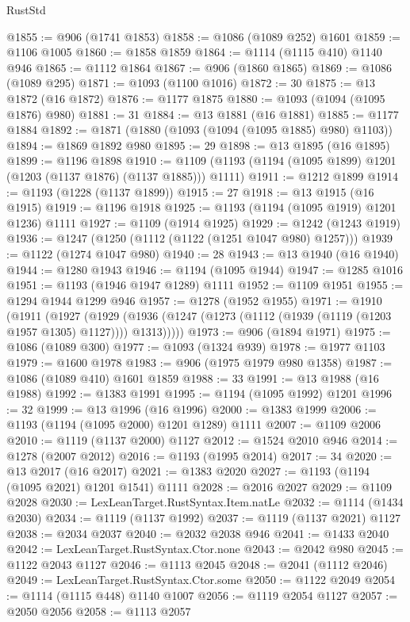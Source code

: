 \begin{lexlean}{RustStd}
\begin{coremodule}
{\begin{coremodule}
{{{{{{{{{{{{{{{{{{{{{{{{{{{{{{{@1855 := @906 (@1741 @1853)
@1858 := @1086 (@1089 @252) @1601
@1859 := @1106 @1005
@1860 := @1858 @1859
@1864 := @1114 (@1115 @410) @1140 @946
@1865 := @1112 @1864
@1867 := @906 (@1860 @1865)
@1869 := @1086 (@1089 @295)
@1871 := @1093 (@1100 @1016)
@1872 := 30
@1875 := @13 @1872 (@16 @1872)
@1876 := @1177 @1875
@1880 := @1093 (@1094 (@1095 @1876) @980)
@1881 := 31
@1884 := @13 @1881 (@16 @1881)
@1885 := @1177 @1884
@1892 := @1871 (@1880 (@1093 (@1094 (@1095 @1885) @980) @1103))
@1894 := @1869 @1892 @980
@1895 := 29
@1898 := @13 @1895 (@16 @1895)
@1899 := @1196 @1898
@1910 := @1109 (@1193 (@1194 (@1095 @1899) @1201 (@1203 (@1137 @1876) (@1137 @1885))) @1111)
@1911 := @1212 @1899
@1914 := @1193 (@1228 (@1137 @1899))
@1915 := 27
@1918 := @13 @1915 (@16 @1915)
@1919 := @1196 @1918
@1925 := @1193 (@1194 (@1095 @1919) @1201 @1236) @1111
@1927 := @1109 (@1914 @1925)
@1929 := @1242 (@1243 @1919)
@1936 := @1247 (@1250 (@1112 (@1122 (@1251 @1047 @980) @1257)))
@1939 := @1122 (@1274 @1047 @980)
@1940 := 28
@1943 := @13 @1940 (@16 @1940)
@1944 := @1280 @1943
@1946 := @1194 (@1095 @1944)
@1947 := @1285 @1016
@1951 := @1193 (@1946 @1947 @1289) @1111
@1952 := @1109 @1951
@1955 := @1294 @1944 @1299 @946
@1957 := @1278 (@1952 @1955)
@1971 := @1910
    (@1911
      (@1927
        (@1929 (@1936 (@1247 (@1273 (@1112 (@1939 (@1119 (@1203 @1957 @1305) @1127)))) @1313)))))
@1973 := @906 (@1894 @1971)
@1975 := @1086 (@1089 @300)
@1977 := @1093 (@1324 @939)
@1978 := @1977 @1103
@1979 := @1600 @1978
@1983 := @906 (@1975 @1979 @980 @1358)
@1987 := @1086 (@1089 @410) @1601 @1859
@1988 := 33
@1991 := @13 @1988 (@16 @1988)
@1992 := @1383 @1991
@1995 := @1194 (@1095 @1992) @1201
@1996 := 32
@1999 := @13 @1996 (@16 @1996)
@2000 := @1383 @1999
@2006 := @1193 (@1194 (@1095 @2000) @1201 @1289) @1111
@2007 := @1109 @2006
@2010 := @1119 (@1137 @2000) @1127
@2012 := @1524 @2010 @946
@2014 := @1278 (@2007 @2012)
@2016 := @1193 (@1995 @2014)
@2017 := 34
@2020 := @13 @2017 (@16 @2017)
@2021 := @1383 @2020
@2027 := @1193 (@1194 (@1095 @2021) @1201 @1541) @1111
@2028 := @2016 @2027
@2029 := @1109 @2028
@2030 := LexLeanTarget.RustSyntax.Item.natLe
@2032 := @1114 (@1434 @2030)
@2034 := @1119 (@1137 @1992)
@2037 := @1119 (@1137 @2021) @1127
@2038 := @2034 @2037
@2040 := @2032 @2038 @946
@2041 := @1433 @2040
@2042 := LexLeanTarget.RustSyntax.Ctor.none
@2043 := @2042 @980
@2045 := @1122 @2043 @1127
@2046 := @1113 @2045
@2048 := @2041 (@1112 @2046)
@2049 := LexLeanTarget.RustSyntax.Ctor.some
@2050 := @1122 @2049
@2054 := @1114 (@1115 @448) @1140 @1007
@2056 := @1119 @2054 @1127
@2057 := @2050 @2056
@2058 := @1113 @2057
}}}}}}}}}}}}}}}}}}}}}}}}}}}}}}}
\end{coremodule}}
\end{coremodule}
\end{lexlean}
